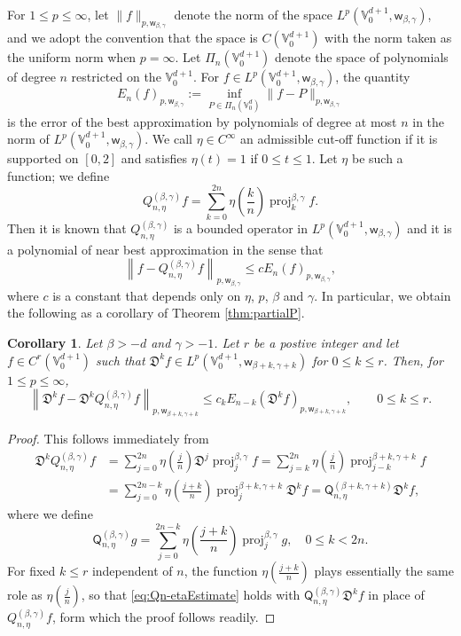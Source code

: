 \documentclass{amsart}
\newtheorem{cor}[thm]{Corollary}
\theoremstyle{remark}
\def\sw{{\mathsf w}}
\def\sQ{{\mathsf Q}}
\def\fD{{\mathfrak D}}
\def\b{{\beta}}
\def\g{{\gamma}}
\def\VV{{\mathbb V}}
\def\proj{\operatorname{proj}}
\def\f{\frac}
\begin{document}
For $1 \le p \le \infty$, let $\|f\|_{p, \sw_{\b,\g}}$ denote the norm of the space $L^p(\VV_0^{d+1}, \sw_{\b,\g})$, and
we adopt the convention that the space is $C(\VV_0^{d+1})$ with the norm taken as the uniform norm when
$p = \infty$. Let $\Pi_n(\VV_0^{d+1})$ denote the space of polynomials of degree $n$ restricted on the
$\VV_0^{d+1}$. For $f \in L^p(\VV_0^{d+1}, \sw_{\b,\g})$, the quantity
$$
     E_n(f)_{p, \sw_{\b,\g}} := \inf_{P \in \Pi_n(\VV_0^d)} \| f - P \|_{p, \sw_{\b,\g}}
$$
is the error of the best approximation by polynomials of degree at most $n$ in the norm of $L^p(\VV_0^{d+1}, \sw_{\b,\g})$.
We call $\eta \in C^\infty$ an admissible cut-off function if it is supported on $[0,2]$ and satisfies
$\eta(t) = 1$ if $0 \le t \le 1$. Let $\eta$ be such a function; we define
\begin{equation} \label{eq:Qn-eta}
  Q_{n,\eta}^{(\b,\g)} f = \sum_{k=0}^{2n} \eta\left(\f k n \right) \proj_k^{\b,\g} f.
\end{equation}
Then it is known \cite{X21} that $Q_{n,\eta}^{(\b,\g)}$ is a bounded operator in $L^p(\VV_0^{d+1}, \sw_{\b,\g})$ and it is
a polynomial of near best approximation in the sense that
\begin{equation} \label{eq:Qn-etaEstimate}
    \left \| f -  Q_{n,\eta}^{(\b,\g)} f\right \|_{p, \sw_{\b,\g}} \le c E_n (f)_{p,\sw_{\b,\g}},
\end{equation}
where $c$ is a constant that depends only on $\eta$, $p$, $\b$ and $\g$. In particular, we obtain the following as
a corollary of Theorem \ref{thm:partialP}.

\begin{cor} \label{cor:approxQ}
Let $\b > -d$ and $\g > -1$. Let $r$ be a postive integer and let $f \in C^r(\VV_0^{d+1})$ such that
 $\fD^k f \in  L^p(\VV_0^{d+1}, \sw_{\b+k,\g+k})$ for $0 \le k \le r$.  Then, for $1 \le p \le \infty$,
$$
  \left \| \fD^k f - \fD^k Q_{n,\eta}^{(\b,\g)}f\right \|_{p, \sw_{\b+k,\g+k} } \le c_k
      E_{n-k} (\fD^k f)_{p, \sw_{\b+k,\g+k} }, \qquad 0 \le k \le r.
$$
\end{cor}

\begin{proof}
This follows immediately from
\begin{align*}
   \fD^k Q_{n,\eta}^{(\b,\g)} f & =   \sum_{j=0}^{2n} \eta\left(\f j n \right)  \fD^j\proj_j^{\b,\g} f
       =   \sum_{j=k}^{2n} \eta\left(\f j n \right) \proj_{j-k}^{\b+k,\g+k} f \\
      & =   \sum_{j=0}^{2n-k} \eta\left(\f {j+k}n \right) \proj_{j}^{\b+k,\g+k}  \fD^k f
         = \sQ_{n,\eta}^{(\b+k,\g+k)}  \fD^k  f,
\end{align*}
where we define
\begin{equation} \label{eq:wtQ}
  \sQ_{ n,\eta}^{(\b,\g)} g =  \sum_{j=0}^{2n-k} \eta\left(\f {j+k}n \right) \proj_{j}^{\b,\g} g, \quad 0 \le k < 2n.
\end{equation}
For fixed $k \le r$ independent of $n$, the function $\eta\left(\f {j+k}n \right)$ plays essentially the same role
as $\eta\left(\f {j}n \right)$, so that \eqref{eq:Qn-etaEstimate} holds with $\sQ_{n,\eta}^{(\b,\g)} \fD^k f$ in place
of $Q_{n,\eta}^{(\b,\g)}f$, form which the proof follows readily.
\end{proof}
\end{document}
